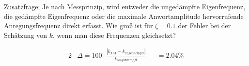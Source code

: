\underline{Zusatzfrage:} Je nach Messprinzip, wird entweder die ungedämpfte
Eigenfrequenz, die gedämpfte Eigenfrequenz oder die maximale Anwortamplitude
hervorrufende Anregungsfrequenz direkt erfasst. Wie groß ist für $\zeta = 0.1$ der
Fehler bei der Schätzung von $k$, wenn man diese Frequenzen gleichsetzt?

\begin{solution}
    \begin{alignat*}{2}
        &\Delta = 100 \cdot \frac{|k_{MA} - k_\mathrm{ungedaempft}|}{k_{ungedaempft}} &&= 2.04 \% \\ 
    \end{alignat*}
\end{solution}


